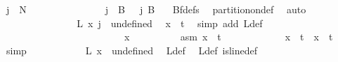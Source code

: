 \begin{isabellebody}
\ {\isachardoublequoteopen}j\ {\isasymnotin}\ {\isacharbraceleft}{\kern0pt}{\isachardot}{\kern0pt}{\isachardot}{\kern0pt}{\isacharless}{\kern0pt}N{\isacharprime}{\kern0pt}{\isacharbraceright}{\kern0pt}{\isachardoublequoteclose}\isanewline
\ \ \ \ \ \ \ \ \ \ \ \ \isamarkupfalse%
\ \isamarkupfalse%
\ {\isachardoublequoteopen}j\ {\isasymnotin}\ {\isacharparenleft}{\kern0pt}B\ {}{\isacharparenright}{\kern0pt}\ {\isasymand}\ j{\isasymnotin}\ B\ {}{\isachardoublequoteclose}\ \isamarkupfalse%
\ Bf{\isacharunderscore}{\kern0pt}defs\ \isamarkupfalse%
\ partition{\isacharunderscore}{\kern0pt}on{\isacharunderscore}{\kern0pt}def\ \isamarkupfalse%
\ auto\isanewline
\ \ \ \ \ \ \ \ \ \ \ \ \isamarkupfalse%
\ \isamarkupfalse%
\ {\isachardoublequoteopen}L{\isacharprime}{\kern0pt}\ x\ j\ {\isacharequal}{\kern0pt}\ undefined{\isachardoublequoteclose}\ \isamarkupfalse%
\ {\isacartoucheopen}x\ {\isacharequal}{\kern0pt}\ t{\isacartoucheclose}\ \isamarkupfalse%
\ {\isacharparenleft}{\kern0pt}simp\ add{\isacharcolon}{\kern0pt}\ L{\isacharprime}{\kern0pt}{\isacharunderscore}{\kern0pt}def{\isacharparenright}{\kern0pt}\isanewline
\ \ \ \ \ \ \ \ \ \ \isamarkupfalse%
\isanewline
\ \ \ \ \ \ \ \ \isamarkupfalse%
\isanewline
\ \ \ \ \ \ \isamarkupfalse%
\isanewline
\ \ \ \ \ \ \ \ \isamarkupfalse%
\ x\isanewline
\ \ \ \ \ \ \ \ \isamarkupfalse%
\ asm{\isacharcolon}{\kern0pt}\ {\isachardoublequoteopen}x\ {\isasymnotin}\ {\isacharbraceleft}{\kern0pt}{\isachardot}{\kern0pt}{\isachardot}{\kern0pt}{\isacharless}{\kern0pt}t{\isacharplus}{\kern0pt}{}{\isacharbraceright}{\kern0pt}{\isachardoublequoteclose}\ \isanewline
\ \ \ \ \ \ \ \ \isamarkupfalse%
\ \isamarkupfalse%
\ {\isachardoublequoteopen}x\ {\isasymnotin}\ {\isacharbraceleft}{\kern0pt}{\isachardot}{\kern0pt}{\isachardot}{\kern0pt}{\isacharless}{\kern0pt}t{\isacharbraceright}{\kern0pt}\ {\isasymand}\ x\ {\isasymnoteq}\ t{\isachardoublequoteclose}\ \isamarkupfalse%
\ simp\isanewline
\ \ \ \ \ \ \ \ \isamarkupfalse%
\ \isamarkupfalse%
\ {\isachardoublequoteopen}L{\isacharprime}{\kern0pt}\ x\ {\isacharequal}{\kern0pt}\ undefined{\isachardoublequoteclose}\ \isamarkupfalse%
\ L{\isacharunderscore}{\kern0pt}def\ \isamarkupfalse%
\ L{\isacharprime}{\kern0pt}{\isacharunderscore}{\kern0pt}def\ is{\isacharunderscore}{\kern0pt}line{\isacharunderscore}{\kern0pt}def\ \isamarkupfalse%

\end{isabellebody}
